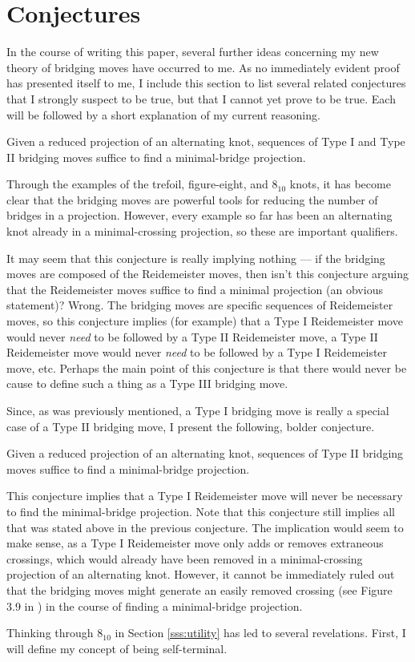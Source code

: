 \documentclass[titlepage,11pt]{article}
\begin{document}
\section{Conjectures}
In the course of writing this paper, several further ideas concerning my new theory of bridging moves have occurred to me. As no immediately evident proof has presented itself to me, I include this section to list several related conjectures that I strongly suspect to be true, but that I cannot yet prove to be true. Each will be followed by a short explanation of my current reasoning.

\begin{conj}
    Given a reduced projection of an alternating knot, sequences of Type I and Type II bridging moves suffice to find a minimal-bridge projection.
\end{conj}

Through the examples of the trefoil, figure-eight, and $8_{10}$ knots, it has become clear that the bridging moves are powerful tools for reducing the number of bridges in a projection. However, every example so far has been an alternating knot already in a minimal-crossing projection, so these are important qualifiers.\par
It may seem that this conjecture is really implying nothing --- if the bridging moves are composed of the Reidemeister moves, then isn't this conjecture arguing that the Reidemeister moves suffice to find a minimal projection (an obvious statement)? Wrong. The bridging moves are specific sequences of Reidemeister moves, so this conjecture implies (for example) that a Type I Reidemeister move would never \emph{need} to be followed by a Type II Reidemeister move, a Type II Reidemeister move would never \emph{need} to be followed by a Type I Reidemeister move, etc. Perhaps the main point of this conjecture is that there would never be cause to define such a thing as a Type III bridging move.\par
Since, as was previously mentioned, a Type I bridging move is really a special case of a Type II bridging move, I present the following, bolder conjecture.

\begin{conj}
    Given a reduced projection of an alternating knot, sequences of Type II bridging moves suffice to find a minimal-bridge projection.
\end{conj}

This conjecture implies that a Type I Reidemeister move will never be necessary to find the minimal-bridge projection. Note that this conjecture still implies all that was stated above in the previous conjecture. The implication would seem to make sense, as a Type I Reidemeister move only adds or removes extraneous crossings, which would already have been removed in a minimal-crossing projection of an alternating knot. However, it cannot be immediately ruled out that the bridging moves might generate an easily removed crossing (see Figure 3.9 in \cite{bib:knotnotes}) in the course of finding a minimal-bridge projection.\par
Thinking through $8_{10}$ in Section \ref{sss:utility} has led to several revelations. First, I will define my concept of being self-terminal.
\end{document}
